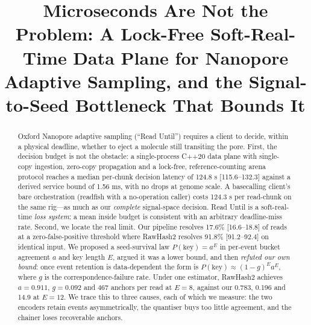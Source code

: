 \documentclass[conference]{IEEEtran}
\begin{document}
\title{Microseconds Are Not the Problem: A Lock-Free Soft-Real-Time Data Plane for Nanopore
Adaptive Sampling, and the Signal-to-Seed Bottleneck That Bounds It}

\author{
}

\maketitle

\begin{abstract}
Oxford Nanopore adaptive sampling (``Read Until'') requires a client to
decide, within a physical deadline, whether to eject a molecule still transiting the pore.
First, the decision budget is not the obstacle: a single-process C++20 data plane with
single-copy ingestion, zero-copy propagation and a lock-free, reference-counting arena
protocol reaches a median per-chunk decision latency of 124.8 \textmu{}s [115.6--132.3] against a
derived service bound of 1.56 ms, with no drops at genome scale. A basecalling client's bare
orchestration (readfish with a no-operation caller) costs 124.3 \textmu{}s per read-chunk on the same
rig---as much as our \emph{complete} signal-space decision. Read Until is a soft-real-time
\emph{loss system}: a mean inside budget is consistent with an arbitrary deadline-miss rate.
Second, we locate the real limit. Our pipeline resolves 17.6\% [16.6--18.8] of reads at a
zero-false-positive threshold where RawHash2 resolves 91.8\% [91.2--92.4] on identical
input. We proposed a seed-survival law
$P(\mathrm{key}) = a^{E}$ in per-event bucket agreement $a$ and key length $E$, argued it was
a lower bound, and then \emph{refuted our own bound}: once event retention is data-dependent
the form is $P(\mathrm{key}) \approx (1-g)^{E} a^{E}$, where $g$ is the correspondence-failure
rate. Under one estimator, RawHash2 achieves $a = 0.911$, $g = 0.092$ and
467 anchors per read at $E = 8$, against our 0.783, 0.196 and 14.9 at $E = 12$. We trace this
to three causes, each of which we measure: the two encoders retain events asymmetrically, the
quantiser buys too little agreement, and the chainer loses recoverable anchors.
\end{abstract}
\end{document}

